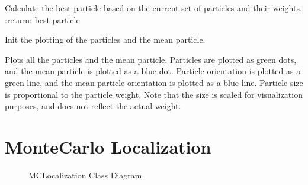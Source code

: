 \documentclass[letterpaper,10pt,english]{sphinxmanual}
\begin{document}
\begin{fulllineitems}
\begin{fulllineitems}
\end{fulllineitems}


\begin{fulllineitems}
\label{\detokenize{particle_filter:ParticleFilter.ParticleFilter.get_best_particle}}
\sphinxAtStartPar
Calculate the best particle based on the current set of particles and their weights.
:return: best particle

\end{fulllineitems}


\begin{fulllineitems}
\label{\detokenize{particle_filter:ParticleFilter.ParticleFilter.init_plotting}}
\sphinxAtStartPar
Init the plotting of the particles and the mean particle.

\end{fulllineitems}


\begin{fulllineitems}
\label{\detokenize{particle_filter:ParticleFilter.ParticleFilter.PlotParticles}}
\sphinxAtStartPar
Plots all the particles and the mean particle.
Particles are plotted as green dots, and the mean particle is plotted as a blue dot.
Particle orientation is plotted as a green line, and the mean particle orientation is plotted as a blue line.
Particle size is proportional to the particle weight.
Note that the size is scaled for visualization purposes, and does not reflect the actual weight.

\end{fulllineitems}


\end{fulllineitems}



\section{MonteCarlo Localization}
\label{\detokenize{particle_filter:montecarlo-localization}}
\begin{figure}[htbp]
\centering
\capstart

\noindent{}
\caption{MCLocalization Class Diagram.}\label{\detokenize{particle_filter:id2}}\end{figure}
\end{document}

